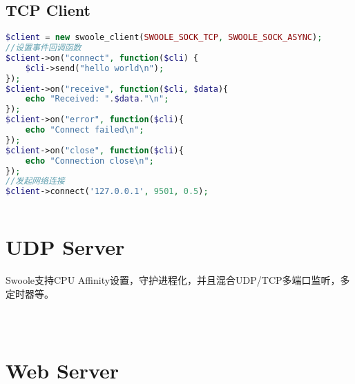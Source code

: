 \begin{lstlisting}[language=PHP]

\end{lstlisting}


\section{TCP Client}




\begin{lstlisting}[language=PHP]
$client = new swoole_client(SWOOLE_SOCK_TCP, SWOOLE_SOCK_ASYNC);
//设置事件回调函数
$client->on("connect", function($cli) {
    $cli->send("hello world\n");
});
$client->on("receive", function($cli, $data){
    echo "Received: ".$data."\n";
});
$client->on("error", function($cli){
    echo "Connect failed\n";
});
$client->on("close", function($cli){
    echo "Connection close\n";
});
//发起网络连接
$client->connect('127.0.0.1', 9501, 0.5);
\end{lstlisting}








\begin{lstlisting}[language=PHP]

\end{lstlisting}



\chapter{UDP Server}

Swoole支持CPU Affinity设置，守护进程化，并且混合UDP/TCP多端口监听，多定时器等。

\begin{lstlisting}[language=PHP]

\end{lstlisting}




\begin{lstlisting}[language=PHP]

\end{lstlisting}




\begin{lstlisting}[language=PHP]

\end{lstlisting}

\chapter{Web Server}


